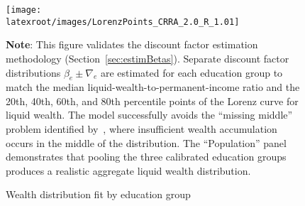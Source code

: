 \documentclass{econsocart}
\begin{document}
\begin{figure}[htb] 
  \centering
  \caption{Wealth distribution fit by education group}
  \label{fig:LorenzPts} 
  \texttt{[image: \\latexroot/images/LorenzPoints\_CRRA\_2.0\_R\_1.01]}

  \medskip
  \noindent\parbox{\textwidth}{\footnotesize
    \textbf{Note}: This figure validates the discount factor estimation methodology (Section~\ref{sec:estimBetas}).
    Separate discount factor distributions $\beta_e \pm \nabla_e$ are estimated for each education group
    to match the median liquid-wealth-to-permanent-income ratio and the 20th, 40th, 60th, and 80th
    percentile points of the Lorenz curve for liquid wealth.
    The model successfully avoids the ``missing middle'' problem identified by~\cite{kaplanMPC2022},
    where insufficient wealth accumulation occurs in the middle of the distribution.
    The ``Population'' panel demonstrates that pooling the three calibrated education groups
    produces a realistic aggregate liquid wealth distribution.
  }
\end{figure}

\vspace{0.5em}
\end{document}
